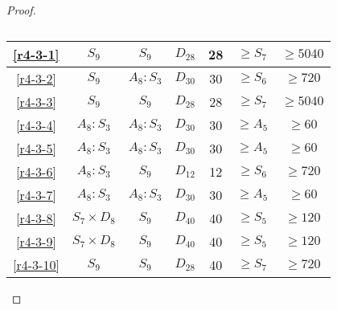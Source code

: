 \begin{proof}
\begin{table}
\begin{tabular}{|c|c|c|c|c|c|c|}
      \ref{r4-3-1} & $S_9$ & $S_9$ & $D_{28}$ & 28 & $\ge S_7$ & $\ge 5040$ \\ \hline
      \ref{r4-3-2} & $S_9$ & $A_8 : S_3$ & $D_{30}$ & 30 & $\ge S_6$ & $\ge 720$  \\ \hline
      \ref{r4-3-3} & $S_9$ & $S_9$ & $D_{28}$ & 28 & $\ge S_7$ & $\ge 5040$ \\ \hline
      \ref{r4-3-4} & $A_8 : S_3$ & $A_8 : S_3$ & $D_{30}$ & 30 & $\ge A_5$ & $\ge 60$ \\ \hline
      \ref{r4-3-5} & $A_8 : S_3$ & $A_8 : S_3$ & $D_{30}$ & 30 & $\ge A_5$ & $\ge 60$ \\ \hline
      \ref{r4-3-6} & $A_8 : S_3$ & $S_9$ & $D_{12}$ & 12 & $\ge S_6$ & $\ge 720$ \\ \hline
      \ref{r4-3-7} & $A_8 : S_3$ & $A_8 : S_3$ & $D_{30}$ & 30 & $\ge A_5$ & $\ge 60$  \\ \hline
      \ref{r4-3-8} & $S_7 \times D_8$ & $S_9$ & $D_{40}$ & 40 & $\ge S_5$ & $\ge 120$ \\ \hline
      \ref{r4-3-9} & $S_7 \times D_8$ & $S_9$ & $D_{40}$ & 40 & $\ge S_5$ & $\ge 120$ \\ \hline
      \ref{r4-3-10}& $S_9$ & $S_9$ & $D_{28}$ & 40 & $\ge S_7$ & $\ge 720$ \\ \hline

    \end{tabular}
    \caption{}
    \label{results-2-2}
  \end{table}

\end{proof}
